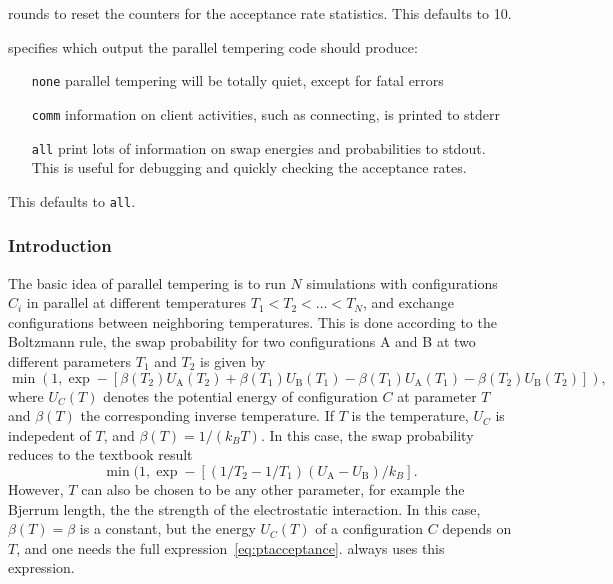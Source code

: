 \begin{arguments}
  rounds to reset the counters for the acceptance rate statistics.
  This defaults to 10.
\item[\var{info}] specifies which output the parallel tempering code
  should produce:
  \begin{itemize}
  \item[\texttt{none}] parallel tempering will be totally quiet,
    except for fatal errors
  \item[\texttt{comm}] information on client activities, such as
    connecting, is printed to stderr
  \item[\texttt{all}] print lots of information on swap energies and
    probabilities to stdout. This is useful for debugging and quickly
    checking the acceptance rates.
  \end{itemize}
  This defaults to \texttt{all}.
\end{arguments}

\subsubsection{Introduction}

The basic idea of parallel tempering is to run $N$ simulations with configurations $C_i$ in
parallel at different temperatures $T_1<T_2<\hdots<T_N$, and exchange configurations between
neighboring temperatures. This is done according to the Boltzmann rule, \ie the swap probability
for two configurations A and B at two different parameters $T_1$ and $T_2$ is given by
\begin{equation}
  \label{eq:ptacceptance}
  \min\left(1,\exp -\left[\beta(T_2)U_\text{A}(T_2) + \beta(T_1)U_\text{B}(T_1) -
    \beta(T_1)U_\text{A}(T_1) - \beta(T_2)U_\text{B}(T_2)\right]\right),
\end{equation}
where $U_C(T)$ denotes the potential energy of configuration $C$ at parameter $T$ and $\beta(T)$
the corresponding inverse temperature. If $T$ is the temperature, $U_C$ is indepedent of $T$, and
$\beta(T)=1/(k_BT)$. In this case, the swap probability reduces to the textbook result
\begin{equation}
  \min(1,\exp -\left[\left(1/T_2 - 1/T_1\right)\left(U_\text{A} - U_\text{B}\right)/k_B\right].
\end{equation}
However, $T$ can also be chosen to be any other parameter, for example the Bjerrum length, \ie the
the strength of the electrostatic interaction. In this case, $\beta(T)=\beta$ is a constant, but
the energy $U_C(T)$ of a configuration $C$ depends on $T$, and one needs the full
expression~\eqref{eq:ptacceptance}. \es{} always uses this expression.


